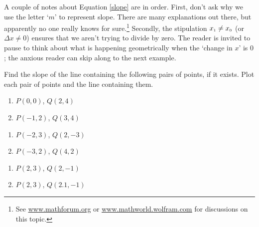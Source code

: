 \documentclass{ximera}
\begin{document}
A couple of notes about Equation \ref{slope} are in order.  First, don't ask why we use the letter `$m$' to represent slope.  There are many explanations out there, but apparently no one really knows for sure.\footnote{See  \href{http://mathforum.org/dr.math/faq/faq.terms.html}{\underline{www.mathforum.org}} or \href{http://mathworld.wolfram.com/Slope.html}{\underline{www.mathworld.wolfram.com}} for discussions on this topic.} Secondly, the stipulation  $x_{\mbox{\tiny$1$}} \neq x_{\mbox{\tiny$0$}}$ (or $\Delta x \neq 0$) ensures that we aren't trying to divide by zero.  The reader is invited to pause to think about what is happening geometrically when the `change in $x$' is $0$; the anxious reader can skip along to the next example.

\begin{ex}  Find the slope of the line containing the following pairs of points, if it exists.  Plot each pair of points and the line containing them.

\begin{multicols}{2}
\begin{enumerate}

\item  $P(0,0)$, $Q(2,4)$
\item  $P(-1,2)$, $Q(3,4)$

\setcounter{HW}{\value{enumi}}
\end{enumerate}
\end{multicols}

\begin{multicols}{2}
\begin{enumerate}
\setcounter{enumi}{\value{HW}}

\item  $P(-2,3)$, $Q(2,-3)$
\item  $P(-3,2)$, $Q(4,2)$

\setcounter{HW}{\value{enumi}}
\end{enumerate}
\end{multicols}

\begin{multicols}{2}
\begin{enumerate}
\setcounter{enumi}{\value{HW}}

\item  $P(2,3)$, $Q(2,-1)$
\item  $P(2,3)$, $Q(2.1, -1)$

\end{enumerate}
\end{multicols}


\end{ex}
\end{document}
